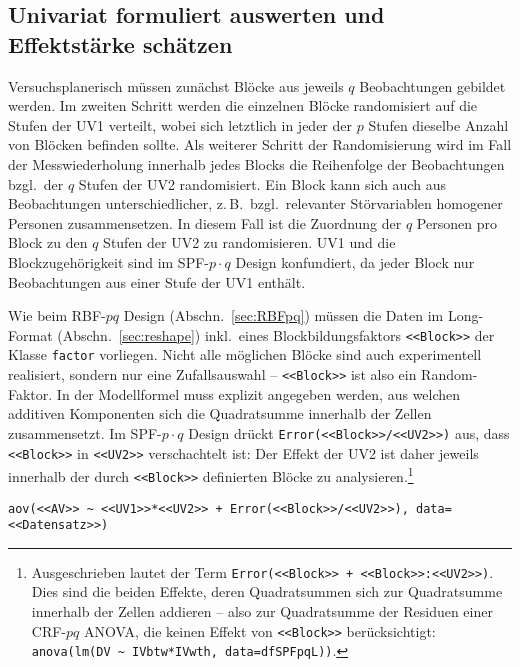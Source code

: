 \subsection{Univariat formuliert auswerten und Effektstärke schätzen}

Versuchsplanerisch müssen zunächst Blöcke aus jeweils $q$ Beobachtungen gebildet werden. Im zweiten Schritt werden die einzelnen Blöcke randomisiert auf die Stufen der UV1 verteilt, wobei sich letztlich in jeder der $p$ Stufen dieselbe Anzahl von Blöcken befinden sollte. Als weiterer Schritt der Randomisierung wird im Fall der Messwiederholung innerhalb jedes Blocks die Reihenfolge der Beobachtungen bzgl.\ der $q$ Stufen der UV2 randomisiert. Ein Block kann sich auch aus Beobachtungen unterschiedlicher, z.\,B.\ bzgl.\ relevanter Störvariablen homogener Personen zusammensetzen. In diesem Fall ist die Zuordnung der $q$ Personen pro Block zu den $q$ Stufen der UV2 zu randomisieren. UV1 und die Blockzugehörigkeit sind im SPF-$p \cdot q$ Design konfundiert, da jeder Block nur Beobachtungen aus einer Stufe der UV1 enthält.

Wie beim RBF-$pq$ Design (Abschn.\ \ref{sec:RBFpq}) müssen die Daten im Long-Format (Abschn.\ \ref{sec:reshape}) inkl.\ eines Blockbildungsfaktors \lstinline!<<Block>>! der Klasse \lstinline!factor! vorliegen. Nicht alle möglichen Blöcke sind auch experimentell realisiert, sondern nur eine Zufallsauswahl -- \lstinline!<<Block>>! ist also ein Random-Faktor. In der Modellformel muss explizit angegeben werden, aus welchen additiven Komponenten sich die Quadratsumme innerhalb der Zellen zusammensetzt. Im SPF-$p \cdot q$ Design drückt \lstinline!Error(<<Block>>/<<UV2>>)! aus, dass \lstinline!<<Block>>! in \lstinline!<<UV2>>! verschachtelt ist: Der Effekt der UV2 ist daher jeweils innerhalb der durch \lstinline!<<Block>>! definierten Blöcke zu analysieren.\footnote{Ausgeschrieben lautet der Term \lstinline!Error(<<Block>> + <<Block>>:<<UV2>>)!. Dies sind die beiden Effekte, deren Quadratsummen sich zur Quadratsumme innerhalb der Zellen addieren -- also zur Quadratsumme der Residuen einer CRF-$pq$ ANOVA, die keinen Effekt von \lstinline!<<Block>>! berücksichtigt: \lstinline!anova(lm(DV ~ IVbtw*IVwth, data=dfSPFpqL))!.}
\begin{lstlisting}
aov(<<AV>> ~ <<UV1>>*<<UV2>> + Error(<<Block>>/<<UV2>>), data=<<Datensatz>>)
\end{lstlisting}

